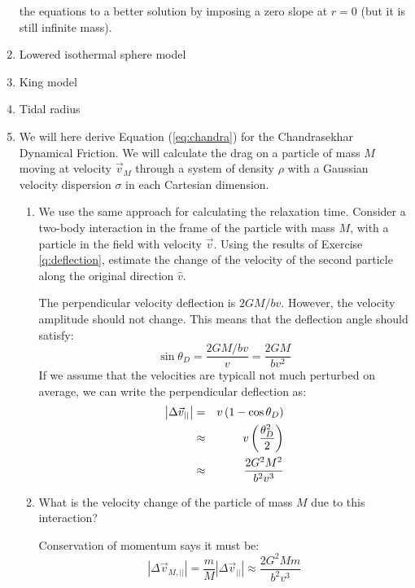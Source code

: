 \begin{enumerate}
the equations to a better solution by imposing a zero slope at $r=0$
(but it is still infinite mass).
\item Lowered isothermal sphere model
\item King model
\item Tidal radius
\item We will here derive Equation (\ref{eq:chandra}) for the
Chandrasekhar Dynamical Friction. We will calculate the drag on a
particle of mass $M$ moving at velocity $\vec{v}_M$ through a system
of density $\rho$ with a Gaussian velocity dispersion $\sigma$ in each
Cartesian dimension.
\begin{enumerate}
\item We use the same approach for calculating the relaxation
time. Consider a two-body interaction in the frame of the particle
with mass $M$, with a particle in the field with velocity
$\vec{v}$. Using the results of Exercise \ref{q:deflection}, estimate
the change of the velocity of the second particle along the
original direction ${\hat v}$. 
\begin{answer}
The perpendicular velocity deflection is $2GM/bv$. However, the
velocity amplitude should not change. This means that the deflection
angle should satisfy:
\begin{equation}
\sin \theta_D = \frac{2GM/ bv}{v} = \frac{2GM}{bv^2}
\end{equation}
If we assume that the velocities are typicall not much perturbed on
average, we can write the perpendicular deflection as:
\begin{eqnarray}
\left|\Delta \vec{v}_{||}\right| &=&
v\left(1- \cos\theta_D\right) \cr
&\approx&
v\left(\frac{\theta_D^2}{2}\right) \cr
&\approx&
\frac{2G^2M^2}{b^2 v^3}
\end{eqnarray}
\end{answer}
\item What is the velocity change of the particle of mass $M$ due to
this interaction?
\begin{answer}
Conservation of momentum says it must be:
\begin{equation}
\left|\Delta \vec{v}_{M,||}\right| = \frac{m}{M} 
\left|\Delta \vec{v}_{||}\right| \approx
\frac{2G^2Mm }{b^2 v^3}
\end{equation}
\end{answer}


\end{enumerate}
\end{enumerate}
